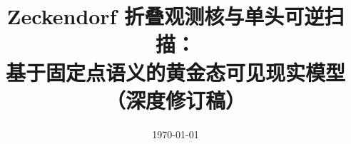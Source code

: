 \documentclass[11pt,letterpaper]{ctexart}
\title{Zeckendorf 折叠观测核与单头可逆扫描：\\\large 基于固定点语义的黄金态可见现实模型（深度修订稿）}
\author{}
\date{\today}
\begin{document}
\maketitle















\FloatBarrier
\appendix






\end{document}
